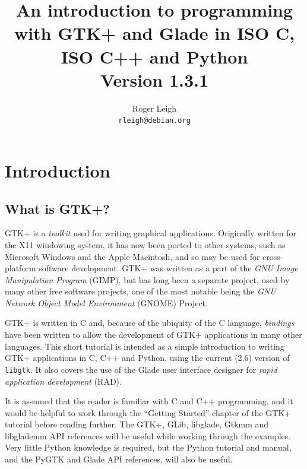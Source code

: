 \documentclass[a4paper,oneside]{article}
\newcommand{\filename}[1]{\texttt{#1}}
\begin{document}
\title{An introduction to programming with GTK+ and Glade in ISO C,
  ISO C++ and Python\\\bigskip\large{Version 1.3.1}}
\author{Roger Leigh\\\texttt{rleigh@debian.org}}
\maketitle

\tableofcontents

\listoffigures

\lstlistoflistings


\section{Introduction}

\subsection{What is GTK+?}

GTK+ is a \emph{toolkit} used for writing graphical applications.
Originally written for the X11 windowing system, it has now been
ported to other systems, such as Microsoft Windows and the Apple
Macintosh, and so may be used for cross-platform software development.
GTK+ was written as a part of the \emph{GNU Image Manipulation
  Program} (GIMP), but has long been a separate project, used by many
other free software projects, one of the most notable being the
\emph{GNU Network Object Model Environment} (GNOME) Project.

GTK+ is written in C and, because of the ubiquity of the C language,
\emph{bindings} have been written to allow the development of GTK+
applications in many other languages.  This short tutorial is intended
as a simple introduction to writing GTK+ applications in C, C++ and
Python, using the current (2.6) version of \filename{libgtk}.  It also
covers the use of the Glade user interface designer for \emph{rapid
  application development} (RAD).

It is assumed that the reader is familiar with C and C++ programming,
and it would be helpful to work through the ``Getting Started''
chapter of the GTK+ tutorial before reading further.  The GTK+, GLib,
libglade, Gtkmm and libglademm API references will be useful while
working through the examples.  Very little Python knowledge is
required, but the Python tutorial and manual, and the PyGTK and Glade
API references, will also be useful.
\end{document}
